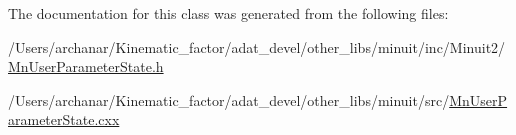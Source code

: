 The documentation for this class was generated from the following files\+:\begin{DoxyCompactItemize}
\item 
/\+Users/archanar/\+Kinematic\+\_\+factor/adat\+\_\+devel/other\+\_\+libs/minuit/inc/\+Minuit2/\mbox{\hyperlink{other__libs_2minuit_2inc_2Minuit2_2MnUserParameterState_8h}{Mn\+User\+Parameter\+State.\+h}}\item 
/\+Users/archanar/\+Kinematic\+\_\+factor/adat\+\_\+devel/other\+\_\+libs/minuit/src/\mbox{\hyperlink{MnUserParameterState_8cxx}{Mn\+User\+Parameter\+State.\+cxx}}\end{DoxyCompactItemize}
